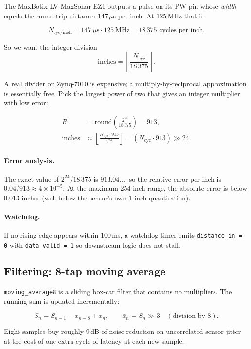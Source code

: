 \documentclass[11pt,a4paper]{article}
\begin{document}
The MaxBotix LV-MaxSonar-EZ1 outputs a pulse on its PW pin whose
\emph{width} equals the round-trip distance: 147\,$\mu$s per inch.  At
125\,MHz that is

\[
  N_{\text{cyc/inch}} = 147~\mu\text{s} \cdot 125~\text{MHz} = 18\,375
  \text{ cycles per inch.}
\]

So we want the integer division
\[
  \text{inches} = \left\lfloor \frac{N_{\text{cyc}}}{18\,375} \right\rfloor.
\]

A real divider on Zynq-7010 is expensive; a multiply-by-reciprocal
approximation is essentially free.  Pick the largest power of two
that gives an integer multiplier with low error:

\begin{align*}
  R &= \mathrm{round}\!\left(\frac{2^{24}}{18\,375}\right) = 913,\\
  \text{inches} &\approx \left\lfloor \frac{N_{\text{cyc}} \cdot 913}{2^{24}} \right\rfloor
                = (N_{\text{cyc}} \cdot 913) \gg 24.
\end{align*}

\paragraph{Error analysis.}
The exact value of $2^{24}/18\,375$ is $913.04\ldots$, so the relative
error per inch is $0.04 / 913 \approx 4 \times 10^{-5}$.  At the
maximum 254-inch range, the absolute error is below 0.013 inches
(well below the sensor's own 1-inch quantisation).

\paragraph{Watchdog.}
If no rising edge appears within 100\,ms, a watchdog timer emits
\texttt{distance\_in = 0} with \texttt{data\_valid = 1} so downstream
logic does not stall.

\subsection{Filtering: 8-tap moving average}

\texttt{moving\_average8} is a sliding box-car filter that contains no
multipliers.  The running sum is updated incrementally:

\[
  S_{n} = S_{n-1} - x_{n-8} + x_{n}, \qquad
  \bar{x}_{n} = S_{n} \gg 3 \quad (\text{division by 8}).
\]

Eight samples buy roughly 9\,dB of noise reduction on uncorrelated
sensor jitter at the cost of one extra cycle of latency at each new
sample.
\end{document}
